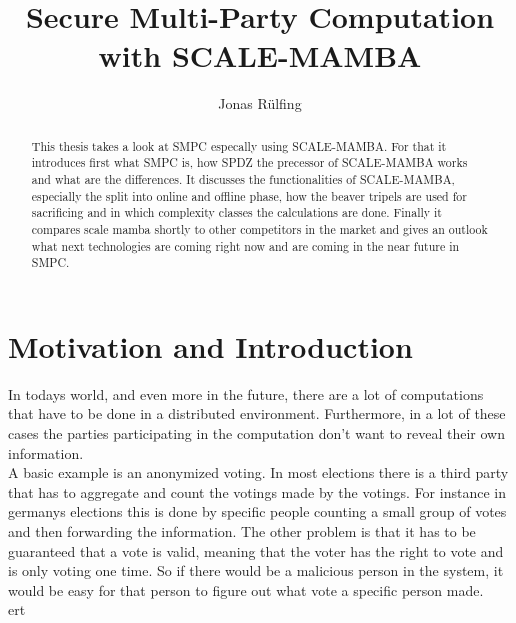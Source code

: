 \documentclass[english,runningheads,a4paper]{llncs}[2018/03/10]
\begin{document}
\title{Secure Multi-Party Computation with SCALE-MAMBA}

\author{Jonas Rülfing}

%
%

\maketitle

\begin{abstract}
  This thesis takes a look at SMPC especally using SCALE-MAMBA. For that it introduces first what SMPC is,  how SPDZ the precessor of SCALE-MAMBA works and what are the differences. It discusses the functionalities of SCALE-MAMBA, especially the split into online and offline phase, how the beaver tripels are used for sacrificing and in which complexity classes the calculations are done. Finally it compares scale mamba shortly to other competitors in the market and gives an outlook what next technologies are coming right now and are coming in the near future in SMPC.
\end{abstract}

\section{Motivation and Introduction}\label{sec:intromoti}

In todays world, and even more in the future, there are a lot of computations that have to be done in a distributed environment. Furthermore, in a lot of these cases the parties participating in the computation don't want to reveal their own information.\\
A basic example is an anonymized voting. In most elections there is a third party that has to aggregate and count the votings made by the votings. For instance in germanys elections this is done by specific people counting a small group of votes and then forwarding the information. The other problem is that it has to be guaranteed that a vote is valid, meaning that the voter has the right to vote and is only voting one time. So if there would be a malicious person in the system, it would be easy for that person to figure out what vote a specific person made.\\
ert
\end{document}
